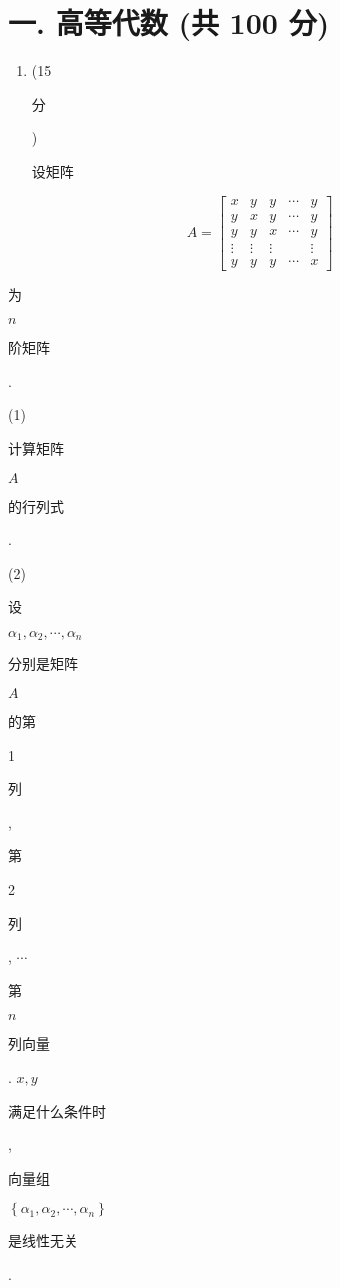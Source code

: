 \documentclass[10pt]{article}
\begin{document}
\section{一. 高等代数 (共 100 分)}
\begin{enumerate}
  \item (15 \begin{CJK}{UTF8}{mj}分\end{CJK}) \begin{CJK}{UTF8}{mj}设矩阵\end{CJK}
\end{enumerate}
$$
A=\left[\begin{array}{ccccc}
x & y & y & \cdots & y \\
y & x & y & \cdots & y \\
y & y & x & \cdots & y \\
\vdots & \vdots & \vdots & & \vdots \\
y & y & y & \cdots & x
\end{array}\right]
$$
\begin{CJK}{UTF8}{mj}为\end{CJK} $n$ \begin{CJK}{UTF8}{mj}阶矩阵\end{CJK}.

(1) \begin{CJK}{UTF8}{mj}计算矩阵\end{CJK} $A$ \begin{CJK}{UTF8}{mj}的行列式\end{CJK}.

(2) \begin{CJK}{UTF8}{mj}设\end{CJK} $\alpha_{1}, \alpha_{2}, \cdots, \alpha_{n}$ \begin{CJK}{UTF8}{mj}分别是矩阵\end{CJK} $A$ \begin{CJK}{UTF8}{mj}的第\end{CJK} 1 \begin{CJK}{UTF8}{mj}列\end{CJK}, \begin{CJK}{UTF8}{mj}第\end{CJK} 2 \begin{CJK}{UTF8}{mj}列\end{CJK}, $\cdots$ \begin{CJK}{UTF8}{mj}第\end{CJK} $n$ \begin{CJK}{UTF8}{mj}列向量\end{CJK}. $x, y$ \begin{CJK}{UTF8}{mj}满足什么条件时\end{CJK}, \begin{CJK}{UTF8}{mj}向量组\end{CJK} $\left\{\alpha_{1}, \alpha_{2}, \cdots, \alpha_{n}\right\}$ \begin{CJK}{UTF8}{mj}是线性无关\end{CJK}.
\end{document}
